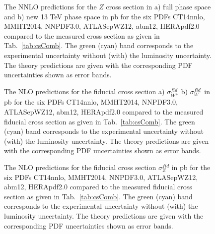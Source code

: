 \begin{figure}[!h]
\begin{minipage}[h]{0.49\linewidth}
\end{minipage}
\hfill
\begin{minipage}[h]{0.49\linewidth}
\end{minipage}
\caption{The NNLO predictions for the $Z$ cross section in a) full phase space and  b) new 13 TeV phase space in pb for the six PDFs CT14nnlo, MMHT2014, NNPDF3.0, ATLASepWZ12, abm12, HERApdf2.0 compared to the measured cross section as given in Tab.~\ref{tab:csComb}. The green (cyan) band corresponds to the experimental uncertainty without (with) the luminosity uncertainty. The theory predictions are given with the corresponding PDF uncertainties shown as error bands.}
\label{fig:AppD3}
\end{figure}

\begin{figure}[!h]
\begin{minipage}[h]{0.45\linewidth}
\end{minipage}
\hfill
\begin{minipage}[h]{0.45\linewidth}
\end{minipage}
\caption{The NLO predictions for the fiducial cross section a) $\sigma^{fid}_{W^+}$  b) $\sigma^{fid}_{W^-}$  in pb for the six PDFs CT14nnlo, MMHT2014, NNPDF3.0, ATLASepWZ12, abm12, HERApdf2.0 compared to the measured fiducial cross section as given in Tab.~\ref{tab:csComb}. The green (cyan) band corresponds to the experimental uncertainty without (with) the luminosity uncertainty. The theory predictions are given with the corresponding PDF uncertainties shown as error bands.}
\label{fig:AppD4}
\end{figure}

\begin{figure}[!h]
\caption{The NLO predictions for the fiducial cross section $\sigma^{fid}_Z$ in pb for the six PDFs CT14nnlo, MMHT2014, NNPDF3.0, ATLASepWZ12, abm12, HERApdf2.0 compared to the measured fiducial cross section as given in Tab.~\ref{tab:csComb}. The green (cyan) band corresponds to the experimental uncertainty without (with) the luminosity uncertainty. The theory predictions are given with the corresponding PDF uncertainties shown as error bands.}
\label{fig:AppD5}
\end{figure}


